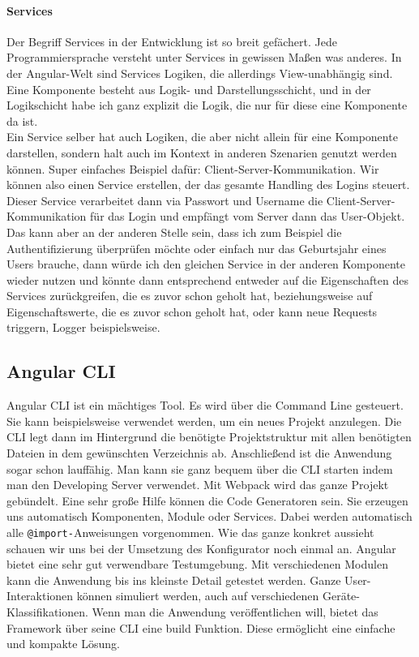 \paragraph{Services}
%
Der Begriff Services in der Entwicklung ist so breit gefächert. Jede Programmiersprache versteht unter Services in gewissen Maßen was anderes. In der Angular-Welt sind Services Logiken, die allerdings View-unabhängig sind. Eine Komponente besteht aus Logik- und Darstellungsschicht, und in der Logikschicht habe ich ganz explizit die Logik, die nur für diese eine Komponente da ist.\\
Ein Service selber hat auch Logiken, die aber nicht allein für eine Komponente darstellen, sondern halt auch im Kontext in anderen Szenarien genutzt werden können. Super einfaches Beispiel dafür: Client-Server-Kommunikation. Wir können also einen Service erstellen, der das gesamte Handling des Logins steuert. Dieser Service verarbeitet dann via Passwort und Username die Client-Server-Kommunikation für das Login und empfängt vom Server dann das User-Objekt. Das kann aber an der anderen Stelle sein, dass ich zum Beispiel die Authentifizierung überprüfen möchte oder einfach nur das Geburtsjahr eines Users brauche, dann würde ich den gleichen Service in der anderen Komponente wieder nutzen und könnte dann entsprechend entweder auf die Eigenschaften des Services zurückgreifen, die es zuvor schon geholt hat, beziehungsweise auf Eigenschaftswerte, die es zuvor schon geholt hat, oder kann neue Requests triggern, Logger beispielsweise.
%
\subsection{Angular CLI}
Angular CLI ist ein mächtiges Tool. Es wird über die Command Line gesteuert. Sie kann beispielsweise verwendet werden, um ein neues Projekt anzulegen. Die CLI legt dann im Hintergrund die benötigte Projektstruktur mit allen benötigten Dateien in dem gewünschten Verzeichnis ab. Anschließend ist die Anwendung sogar schon lauffähig. Man kann sie ganz bequem über die CLI starten indem man den Developing Server verwendet. Mit Webpack wird das ganze Projekt gebündelt. Eine sehr große Hilfe können die Code Generatoren sein. Sie erzeugen uns automatisch Komponenten, Module oder Services. Dabei werden automatisch alle \texttt{@import-}Anweisungen vorgenommen. Wie das ganze konkret aussieht schauen wir uns bei der Umsetzung des Konfigurator noch einmal an. Angular bietet eine sehr gut verwendbare Testumgebung. Mit verschiedenen Modulen kann die Anwendung bis ins kleinste Detail getestet werden. Ganze User-Interaktionen können simuliert werden, auch auf verschiedenen Geräte-Klassifikationen. Wenn man die Anwendung veröffentlichen will, bietet das Framework über seine CLI eine build Funktion. Diese ermöglicht eine einfache und kompakte Lösung.
%
